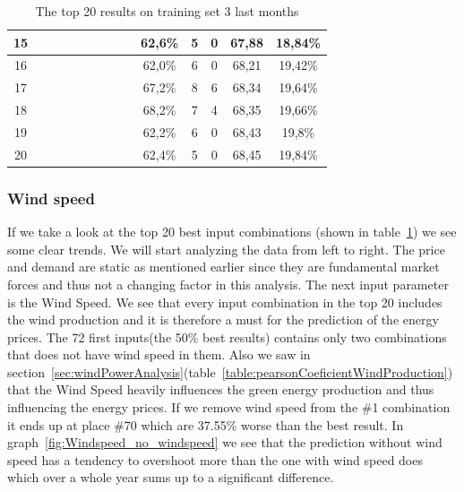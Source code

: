 \begin{table}[H]
{\begin{tabular}{|c|c|c|c|c|c|c|c|c|c|c|c|c|c|}
15 &  \x    & \x    & \x    & \x    & \x    & \x    &       &       & 62,6\% &  5  & 0  & 67,88 & 18,84\% \\ \hline
16 &  \x    & \x    & \x    &       & \x    & \x    &       & \x    & 62,0\% &  6  & 0  & 68,21 & 19,42\% \\ \hline
17 &  \x    & \x    & \x    &       & \x\m  & \x\m  &       &       & 67,2\% &  8  & 6  & 68,34 & 19,64\% \\ \hline
18 &  \x    & \x    & \x    &       & \x\m  &       &       & \x\m  & 68,2\% &  7  & 4  & 68,35 & 19,66\% \\ \hline
19 &  \x    & \x    & \x    & \x    & \x    & \x    & \x    &       & 62,2\% &  6  & 0  & 68,43 & 19,8\% \\ \hline
20 &  \x    & \x    & \x    & \x    & \x    &       &       & \x\m  & 62,4\% &  5  & 0  & 68,45 & 19,84\% \\ \hline
\end{tabular}
}
\caption{The top 20 results on training set 3 last months} %
\label{table:Top20Prices} %
\end{table}

\subsubsection{Wind speed}
If we take a look at the top 20 best input combinations (shown in table~\ref{table:Top20Prices}) we see some clear trends. We will start analyzing the data from left to right. The price and demand are static as mentioned earlier since they are fundamental market forces and thus not a changing factor in this analysis. The next input parameter is the Wind Speed. We see that every input combination in the top 20 includes the wind production and it is therefore a must for the prediction of the energy prices. The 72 first inputs(the 50\% best results) contains only two combinations that does not have wind speed in them. Also we saw in section~\ref{sec:windPowerAnalysis}(table~\ref{table:pearsonCoeficientWindProduction}) that the Wind Speed heavily influences the green energy production and thus influencing the energy prices. If we remove wind speed from the \#1 combination it ends up at place \#70 which are 37.55\% worse than the best result. In graph~\ref{fig:Windspeed_no_windspeed} we see that the prediction without wind speed has a tendency to overshoot more than the one with wind speed does which over a whole year sums up to a significant difference. 

